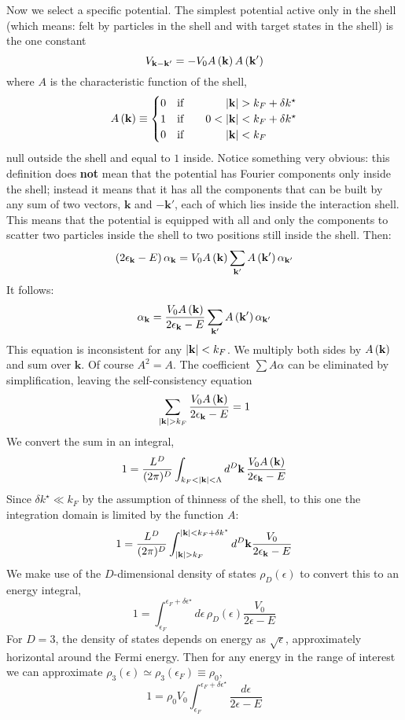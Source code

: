Now we select a specific potential. The simplest potential active only in the shell (which means: felt by particles in the shell and with target states in the shell) is the one constant
\[
	V_{\mathbf{k}-\mathbf{k}'} = - V_0 A\left({\mathbf{k}}\right) A\left({\mathbf{k}'}\right)
\]
where $A$ is the characteristic function of the shell,
\[
	A\lrR{\mathbf{k}} \equiv \begin{cases}
		0 \qq{if} &\hphantom{0<{}}\abs{\mathbf{k}} > k_F + \delta k^\star \\
		1 \qq{if} &0<\abs{\mathbf{k}} < k_F + \delta k^\star \\
		0 \qq{if} &\hphantom{0<{}}\abs{\mathbf{k}} < k_F
	\end{cases}
\]
null outside the shell and equal to $1$ inside. Notice something very obvious: this definition does \textbf{not} mean that the potential has Fourier components only inside the shell; instead it means that it has all the components that can be built by any sum of two vectors, $\mathbf{k}$ and $-\mathbf{k}'$, each of which lies inside the interaction shell. This means that the potential is equipped with all and only the components to scatter two particles inside the shell to two positions still inside the shell. Then:
\[
	\left({2 \epsilon_\mathbf{k} - E}\right) \alpha_\mathbf{k} = V_0 A\left({\mathbf{k}}\right) \sum_{\mathbf{k}'} A\left({\mathbf{k}'}\right) \alpha_{\mathbf{k}'}
\]
It follows:
\begin{equation}\label{eq:bound states with statistics intermediate passage, for inconsistency comment}
	\alpha_\mathbf{k} = \frac{V_0 A\left({\mathbf{k}}\right)}{2 \epsilon_\mathbf{k} - E} \sum_{\mathbf{k}'} A\left({\mathbf{k}'}\right) \alpha_{\mathbf{k}'}
\end{equation}
This equation is inconsistent for any $\abs{\mathbf{k}}<k_F$.
We multiply both sides by $A\left({\mathbf{k}}\right)$ and sum over $\mathbf{k}$. Of course $A^2 = A$. The coefficient $\sum A \alpha$ can be eliminated by simplification, leaving the self-consistency equation
\[
	\sum_{\abs{\mathbf{k}}>k_F} \frac{V_0 A\left({\mathbf{k}}\right)}{2 \epsilon_\mathbf{k} - E} = 1
\]
We convert the sum in an integral,
\[
	1 = \frac{L^D}{(2\pi)^D} \int_{k_F<\abs{\mathbf{k}}<\Lambda} d^D \mathbf{k} \, \frac{V_0 A\left({\mathbf{k}}\right)}{2 \epsilon_\mathbf{k} - E}
\]
Since $\delta k^\star \ll k_F$ by the assumption of thinness of the shell, to this one the integration domain is limited by the function $A$:
\[
	1 = \frac{L^D}{(2\pi)^D} \int_{\abs{\mathbf{k}} > k_F}^{\abs{\mathbf{k}} < k_F+\delta k^\star} d^D \mathbf{k} \frac{V_0}{2 \epsilon_\mathbf{k} - E}
\]
We make use of the $D$-dimensional density of states $\rho_D(\epsilon)$ to convert this to an energy integral,
\[
	1 = \int_{\epsilon_F}^{\epsilon_F+\delta\epsilon^\star} d\epsilon \, \rho_D(\epsilon) \frac{V_0}{2 \epsilon - E}
\]
For $D=3$, the density of states depends on energy as $\sqrt{\epsilon}$, approximately horizontal around the Fermi energy. Then for any energy in the range of interest we can approximate $\rho_3 (\epsilon) \simeq \rho_3 (\epsilon_F) \equiv \rho_0$,
\[
	1 = \rho_0 V_0 \int_{\epsilon_F}^{\epsilon_F+\delta\epsilon^\star} \frac{d\epsilon}{2 \epsilon - E}
\]

